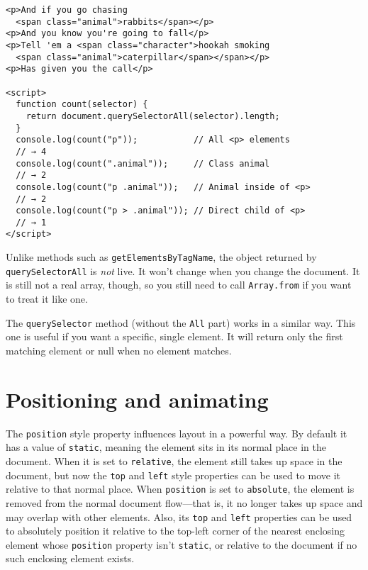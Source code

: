 \begin{lstlisting}
<p>And if you go chasing
  <span class="animal">rabbits</span></p>
<p>And you know you're going to fall</p>
<p>Tell 'em a <span class="character">hookah smoking
  <span class="animal">caterpillar</span></span></p>
<p>Has given you the call</p>

<script>
  function count(selector) {
    return document.querySelectorAll(selector).length;
  }
  console.log(count("p"));           // All <p> elements
  // → 4
  console.log(count(".animal"));     // Class animal
  // → 2
  console.log(count("p .animal"));   // Animal inside of <p>
  // → 2
  console.log(count("p > .animal")); // Direct child of <p>
  // → 1
</script>
\end{lstlisting}
\noindent{}

Unlike methods such as \lstinline`getElementsByTagName`, the object returned by \lstinline`querySelectorAll` is \emph{not} live. It won't change when you change the document. It is still not a real array, though, so you still need to call \lstinline`Array.from` if you want to treat it like one.

The \lstinline`querySelector` method (without the \lstinline`All` part) works in a similar way. This one is useful if you want a specific, single element. It will return only the first matching element or null when no element matches.

\label{dom.animation}\section{Positioning and animating}

The \lstinline`position` style property influences layout in a powerful way. By default it has a value of \lstinline`static`, meaning the element sits in its normal place in the document. When it is set to \lstinline`relative`, the element still takes up space in the document, but now the \lstinline`top` and \lstinline`left` style properties can be used to move it relative to that normal place. When \lstinline`position` is set to \lstinline`absolute`, the element is removed from the normal document flow—that is, it no longer takes up space and may overlap with other elements. Also, its \lstinline`top` and \lstinline`left` properties can be used to absolutely position it relative to the top-left corner of the nearest enclosing element whose \lstinline`position` property isn't \lstinline`static`, or relative to the document if no such enclosing element exists.

